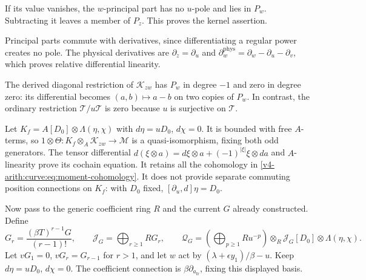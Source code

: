 If its value vanishes, the
$w$-principal part has no $u$-pole and lies in $P_w$.
Subtracting it leaves a member of $P_z$. This proves
the kernel assertion.

Principal parts commute with
derivatives, since differentiating a regular power
creates no pole. The physical derivatives are
$\partial_z=\partial_u$ and
$\partial_w^{\mathrm{phys}}=\partial_w-\partial_u-\partial_v$,
which proves relative differential linearity.

The derived diagonal restriction of $\mathcal K_{zw}$
has $P_w$ in degree $-1$ and zero in degree zero:
its differential becomes $(a,b)\mapsto a-b$ on two
copies of $P_w$. In contrast, the ordinary restriction
$\mathcal T/u\mathcal T$ is zero because $u$ is
surjective on $\mathcal T$.

Let $K_f=A[D_0]\otimes\Lambda(\eta,\chi)$ with
$d\eta=uD_0$, $d\chi=0$.
It is bounded with free $A$-terms, so
$1\otimes\Theta:K_f\otimes_A\mathcal K_{zw}\to\mathcal M$
is a quasi-isomorphism, fixing both odd generators.
The tensor differential
$d(\xi\otimes a)=d\xi\otimes a+(-1)^{|\xi|}\xi\otimes da$
and $A$-linearity prove its cochain equation.
It retains all the cohomology in
\eqref{v4-arith:curve:eq:moment-cohomology}.
It does not provide separate commuting position
connections on $K_f$: with $D_0$ fixed,
$[\partial_u,d]\eta=D_0$.

Now pass to the generic coefficient ring $R$ and the
current $G$ already constructed. Define
\[
 G_r=\frac{(\beta T)^{r-1}G}{(r-1)!},\qquad
 \mathcal J_G=\bigoplus_{r\geq1}RG_r,\qquad
 \mathcal Q_G=
 \left(\bigoplus_{p\geq1}Ru^{-p}\right)
       \otimes_R\mathcal J_G[D_0]\otimes\Lambda(\eta,\chi).
\]
Let $vG_1=0$, $vG_r=G_{r-1}$ for $r>1$, and let $w$
act by $(\lambda+\epsilon y_1)/\beta-u$.
Keep $d\eta=uD_0$, $d\chi=0$.
The coefficient connection is
$\beta\partial_{a_{\mathrm{fr}}}$, fixing this displayed basis.


